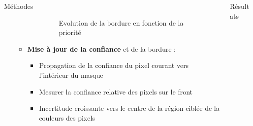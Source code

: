 \documentclass[final,hyperref={pdfpagelabels=false}]{beamer}
\begin{document}
\begin{frame}[t]
\begin{columns}[t]
\begin{column}{.465\textwidth}
\begin{block}{\Large Méthodes}
\begin{itemize}
\begin{itemize}
\begin{itemize}
	
	\begin{figure}[H]
	\centering
	\caption{Evolution de la bordure en fonction de la priorité}
	\end{figure}
	 \end{itemize}
 
\item \textbf{Mise à jour de la confiance} et de la bordure :
	\begin{itemize}
	\item Propagation de la confiance du pixel courant vers l'intérieur du masque
	\item Mesurer la confiance relative des pixels sur le front
	\item Incertitude croissante vers le centre de la région ciblée de la couleurs des pixels 
	\end{itemize}

\end{itemize} 
\end{itemize}


\end{block}

\end{column}


\begin{column}{.465\textwidth}


\begin{block}{\Large Résultats}


\end{block}
\end{column}
\end{columns}
\end{frame}
\end{document}
